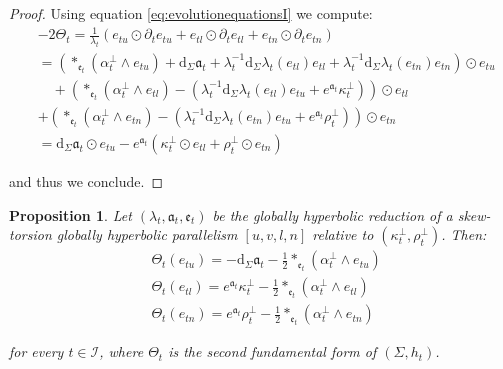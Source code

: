 \documentclass[10pt,reqno,a4paper]{amsart}
\theoremstyle{plain}
\newtheorem{prop}[thm]{Proposition}
\theoremstyle{definition}
\theoremstyle{remark}
\theoremstyle{remark}
\def\dd{\mathrm{d}}
\def\cI{\mathcal{I}}
\def\fra{\mathfrak{a}}
\def\fre{\mathfrak{e}}
\renewcommand{\(}{ (}
\renewcommand{\)}{ )}
\begin{document}
\begin{proof}
Using equation \eqref{eq:evolutionequationsI} we compute:
\begin{eqnarray*}
& -2\Theta_t  = \frac{1}{\lambda_t} (e_{tu} \odot \partial_t e_{tu}  + e_{tl}\odot \partial_t e_{tl} + e_{tn} \odot\partial_t e_{tn}) \\
& = (\ast_{\fre_t} (\alpha^{\perp}_t \wedge e_{tu})  + \dd_{\Sigma} \fra_t  + \lambda_t^{-1} \dd_{\Sigma} \lambda_t (e_{tl}) e_{tl}  + \lambda_t^{-1} \dd_{\Sigma} \lambda_t (e_{tn}) e_{tn}) \odot e_{tu} \\
& \quad + (\ast_{\fre_t} (\alpha^{\perp}_t \wedge e_{tl}) - (\lambda_t^{-1} \dd_{\Sigma} \lambda_t (e_{tl}) e_{tu} + e^{\fra_t}\kappa^{\perp}_t))\odot e_{tl} \\
& + (\ast_{\fre_t} (\alpha^{\perp}_t\wedge e_{tn})  - (\lambda_t^{-1} \dd_{\Sigma} \lambda_t (e_{tn}) e_{tu} + e^{\fra_t}\rho^{\perp}_t)) \odot e_{tn}\\
& = \dd_{\Sigma} \fra_t \odot e_{tu} - e^{\fra_t} (\kappa^{\perp}_t \odot e_{tl} + \rho^{\perp}_t \odot e_{tn})
\end{eqnarray*}

\noindent
and thus we conclude. 
\end{proof}

\begin{prop}
\label{prop:kapparhoisolation}
Let $(\lambda_t,\fra_t,\fre_t)$ be the globally hyperbolic reduction of a skew-torsion globally hyperbolic parallelism $[u,v,l,n]$ relative to $(\kappa^{\perp}_t , \rho^{\perp}_t)$. Then:
\begin{eqnarray}
& \Theta_t (e_{tu}) = -\dd_{\Sigma} \fra_t - \frac{1}{2}\ast_{\fre_t} (\alpha^{\perp}_t \wedge e_{tu})\nonumber\\
& \Theta_t (e_{tl}) = e^{\fra_t} \kappa^{\perp}_t - \frac{1}{2} \ast_{\fre_t} (\alpha^{\perp}_t \wedge e_{tl}) \label{eq:ThetaexpressionII}\\
& \Theta_t (e_{tn}) = e^{\fra_t} \rho^{\perp}_t - \frac{1}{2} \ast_{\fre_t} (\alpha^{\perp}_t \wedge e_{tn})\nonumber
\end{eqnarray}

\noindent
for every $t\in \cI$, where $\Theta_t$ is the second fundamental form of $(\Sigma,h_t)$.
\end{prop}
\end{document}
